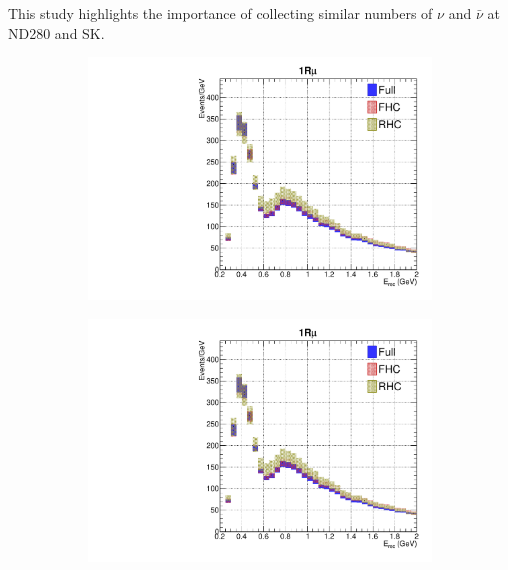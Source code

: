 This study highlights the importance of collecting similar numbers of $\nu$ and $\bar{\nu}$ at ND280 and SK.
\begin{figure}[h]
	\begin{subfigure}[t]{0.32\textwidth}
		\includegraphics[width=\textwidth, trim={0mm 0mm 0mm 0mm}, clip, page=1]{figures/mach3/data/alt/try_2017_fit_on_sk_spectra_posterior_sk_error_run2to4_spectra_posterior_sk_error_run5to6_spectra}
	\end{subfigure}
	\begin{subfigure}[t]{0.32\textwidth}
		\includegraphics[width=\textwidth, trim={0mm 0mm 0mm 0mm}, clip, page=2]{figures/mach3/data/alt/try_2017_fit_on_sk_spectra_posterior_sk_error_run2to4_spectra_posterior_sk_error_run5to6_spectra}
	\end{subfigure}
	\begin{subfigure}[t]{0.32\textwidth}

\end{subfigure}
\end{figure}
